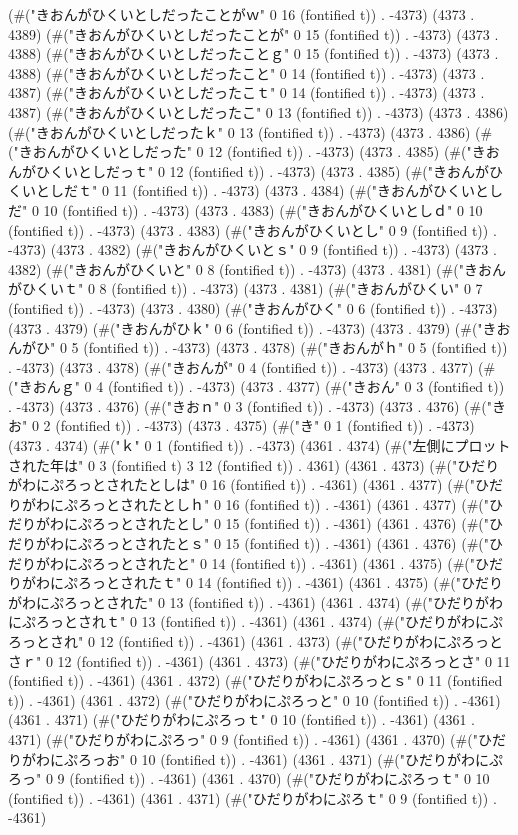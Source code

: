 (#("きおんがひくいとしだったことがｗ" 0 16 (fontified t)) . -4373) (4373 . 4389) (#("きおんがひくいとしだったことが" 0 15 (fontified t)) . -4373) (4373 . 4388) (#("きおんがひくいとしだったことｇ" 0 15 (fontified t)) . -4373) (4373 . 4388) (#("きおんがひくいとしだったこと" 0 14 (fontified t)) . -4373) (4373 . 4387) (#("きおんがひくいとしだったこｔ" 0 14 (fontified t)) . -4373) (4373 . 4387) (#("きおんがひくいとしだったこ" 0 13 (fontified t)) . -4373) (4373 . 4386) (#("きおんがひくいとしだったｋ" 0 13 (fontified t)) . -4373) (4373 . 4386) (#("きおんがひくいとしだった" 0 12 (fontified t)) . -4373) (4373 . 4385) (#("きおんがひくいとしだっｔ" 0 12 (fontified t)) . -4373) (4373 . 4385) (#("きおんがひくいとしだｔ" 0 11 (fontified t)) . -4373) (4373 . 4384) (#("きおんがひくいとしだ" 0 10 (fontified t)) . -4373) (4373 . 4383) (#("きおんがひくいとしｄ" 0 10 (fontified t)) . -4373) (4373 . 4383) (#("きおんがひくいとし" 0 9 (fontified t)) . -4373) (4373 . 4382) (#("きおんがひくいとｓ" 0 9 (fontified t)) . -4373) (4373 . 4382) (#("きおんがひくいと" 0 8 (fontified t)) . -4373) (4373 . 4381) (#("きおんがひくいｔ" 0 8 (fontified t)) . -4373) (4373 . 4381) (#("きおんがひくい" 0 7 (fontified t)) . -4373) (4373 . 4380) (#("きおんがひく" 0 6 (fontified t)) . -4373) (4373 . 4379) (#("きおんがひｋ" 0 6 (fontified t)) . -4373) (4373 . 4379) (#("きおんがひ" 0 5 (fontified t)) . -4373) (4373 . 4378) (#("きおんがｈ" 0 5 (fontified t)) . -4373) (4373 . 4378) (#("きおんが" 0 4 (fontified t)) . -4373) (4373 . 4377) (#("きおんｇ" 0 4 (fontified t)) . -4373) (4373 . 4377) (#("きおん" 0 3 (fontified t)) . -4373) (4373 . 4376) (#("きおｎ" 0 3 (fontified t)) . -4373) (4373 . 4376) (#("きお" 0 2 (fontified t)) . -4373) (4373 . 4375) (#("き" 0 1 (fontified t)) . -4373) (4373 . 4374) (#("ｋ" 0 1 (fontified t)) . -4373) (4361 . 4374) (#("左側にプロットされた年は" 0 3 (fontified t) 3 12 (fontified t)) . 4361) (4361 . 4373) (#("ひだりがわにぷろっとされたとしは" 0 16 (fontified t)) . -4361) (4361 . 4377) (#("ひだりがわにぷろっとされたとしｈ" 0 16 (fontified t)) . -4361) (4361 . 4377) (#("ひだりがわにぷろっとされたとし" 0 15 (fontified t)) . -4361) (4361 . 4376) (#("ひだりがわにぷろっとされたとｓ" 0 15 (fontified t)) . -4361) (4361 . 4376) (#("ひだりがわにぷろっとされたと" 0 14 (fontified t)) . -4361) (4361 . 4375) (#("ひだりがわにぷろっとされたｔ" 0 14 (fontified t)) . -4361) (4361 . 4375) (#("ひだりがわにぷろっとされた" 0 13 (fontified t)) . -4361) (4361 . 4374) (#("ひだりがわにぷろっとされｔ" 0 13 (fontified t)) . -4361) (4361 . 4374) (#("ひだりがわにぷろっとされ" 0 12 (fontified t)) . -4361) (4361 . 4373) (#("ひだりがわにぷろっとさｒ" 0 12 (fontified t)) . -4361) (4361 . 4373) (#("ひだりがわにぷろっとさ" 0 11 (fontified t)) . -4361) (4361 . 4372) (#("ひだりがわにぷろっとｓ" 0 11 (fontified t)) . -4361) (4361 . 4372) (#("ひだりがわにぷろっと" 0 10 (fontified t)) . -4361) (4361 . 4371) (#("ひだりがわにぷろっｔ" 0 10 (fontified t)) . -4361) (4361 . 4371) (#("ひだりがわにぷろっ" 0 9 (fontified t)) . -4361) (4361 . 4370) (#("ひだりがわにぷろっお" 0 10 (fontified t)) . -4361) (4361 . 4371) (#("ひだりがわにぷろっ" 0 9 (fontified t)) . -4361) (4361 . 4370) (#("ひだりがわにぷろっｔ" 0 10 (fontified t)) . -4361) (4361 . 4371) (#("ひだりがわにぷろｔ" 0 9 (fontified t)) . -4361) 